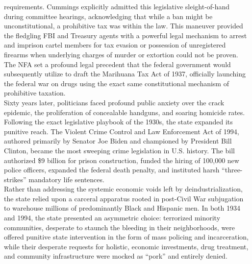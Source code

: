 \documentclass[
]{article}
\begin{document}
requirements. Cummings explicitly admitted this legislative
sleight-of-hand during committee hearings, acknowledging that while a
ban might be unconstitutional, a prohibitive tax was within the law.
This maneuver provided the fledgling FBI and Treasury agents with a
powerful legal mechanism to arrest and imprison cartel members for tax
evasion or possession of unregistered firearms when underlying charges
of murder or extortion could not be proven. The NFA set a profound legal
precedent that the federal government would subsequently utilize to
draft the Marihuana Tax Act of 1937, officially launching the federal
war on drugs using the exact same constitutional mechanism of
prohibitive taxation.\\
Sixty years later, politicians faced profound public anxiety over the
crack epidemic, the proliferation of concealable handguns, and soaring
homicide rates. Following the exact legislative playbook of the 1930s,
the state expanded its punitive reach. The Violent Crime Control and Law
Enforcement Act of 1994, authored primarily by Senator Joe Biden and
championed by President Bill Clinton, became the most sweeping crime
legislation in U.S. history. The bill authorized \$9 billion for prison
construction, funded the hiring of 100,000 new police officers, expanded
the federal death penalty, and instituted harsh ``three-strikes''
mandatory life sentences.\\
Rather than addressing the systemic economic voids left by
deindustrialization, the state relied upon a carceral apparatus rooted
in post-Civil War subjugation to warehouse millions of predominantly
Black and Hispanic men. In both 1934 and 1994, the state presented an
asymmetric choice: terrorized minority communities, desperate to staunch
the bleeding in their neighborhoods, were offered punitive state
intervention in the form of mass policing and incarceration, while their
desperate requests for holistic, economic investments, drug treatment,
and community infrastructure were mocked as ``pork'' and entirely
denied.
\end{document}

